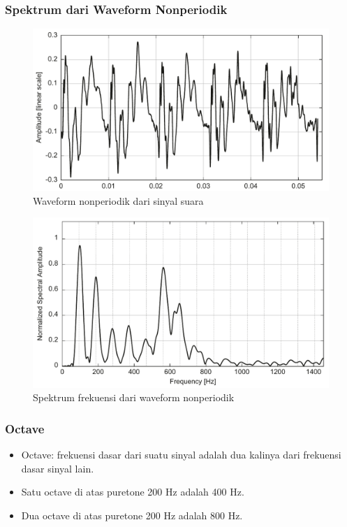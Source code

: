 \documentclass[pdflatex,compress]{beamer}
\begin{document}
\begin{frame}
	\frametitle{Spektrum dari Waveform Nonperiodik}
	\begin{multicols}{2}
		\begin{figure}
			\centering
			\includegraphics[width=\linewidth]{img/img008}
			\caption{Waveform nonperiodik dari sinyal suara}
			\label{fig:img008}
		\end{figure}
		\columnbreak
		\begin{figure}
			\centering
			\includegraphics[width=\linewidth]{img/img009}
			\caption{Spektrum frekuensi dari waveform nonperiodik}
			\label{fig:img009}
		\end{figure}
	\end{multicols}
\end{frame}

\begin{frame}
	\frametitle{Octave}
	\begin{itemize}
		\item Octave: frekuensi dasar dari suatu sinyal adalah dua kalinya dari frekuensi dasar sinyal lain.
		\item Satu octave di atas puretone 200 Hz adalah 400 Hz.
		\item Dua octave di atas puretone 200 Hz adalah 800 Hz.
	\end{itemize}
\end{frame}
\end{document}
